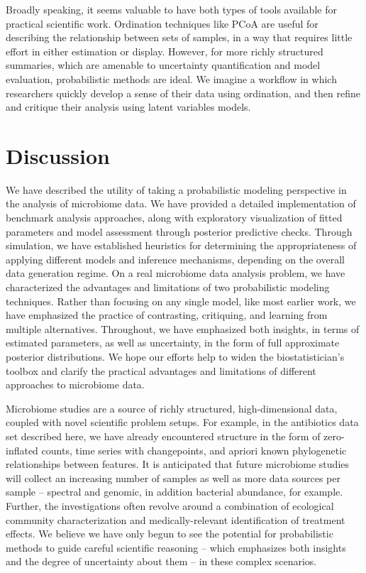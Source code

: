 \documentclass[oupdraft]{bio}
\begin{document}
Broadly speaking, it seems valuable to have both types of tools available for
practical scientific work. Ordination techniques like PCoA are useful for
describing the relationship between sets of samples, in a way that requires
little effort in either estimation or display. However, for more richly
structured summaries, which are amenable to uncertainty quantification and model
evaluation, probabilistic methods are ideal. We imagine a workflow in which
researchers quickly develop a sense of their data using ordination, and then
refine and critique their analysis using latent variables models.

\section{Discussion}

We have described the utility of taking a probabilistic modeling perspective in
the analysis of microbiome data. We have provided a detailed implementation of
benchmark analysis approaches, along with exploratory visualization of fitted
parameters and model assessment through posterior predictive checks. Through
simulation, we have established heuristics for determining the appropriateness
of applying different models and inference mechanisms, depending on the overall
data generation regime. On a real microbiome data analysis problem, we have
characterized the advantages and limitations of two probabilistic modeling
techniques. Rather than focusing on any single model, like most earlier work, we
have emphasized the practice of contrasting, critiquing, and learning from
multiple alternatives. Throughout, we have emphasized both insights, in terms of
estimated parameters, as well as uncertainty, in the form of full approximate
posterior distributions. We hope our efforts help to widen the biostatistician's
toolbox and clarify the practical advantages and limitations of different
approaches to microbiome data.

Microbiome studies are a source of richly structured, high-dimensional data,
coupled with novel scientific problem setups. For example, in the antibiotics
data set described here, we have already encountered structure in the form of
zero-inflated counts, time series with changepoints, and apriori known
phylogenetic relationships between features. It is anticipated that future
microbiome studies will collect an increasing number of samples as well as more
data sources per sample -- spectral and genomic, in addition bacterial
abundance, for example. Further, the investigations often revolve around a
combination of ecological community characterization and medically-relevant
identification of treatment effects. We believe we have only begun to see the
potential for probabilistic methods to guide careful scientific reasoning --
which emphasizes both insights and the degree of uncertainty about them -- in
these complex scenarios.
\end{document}
